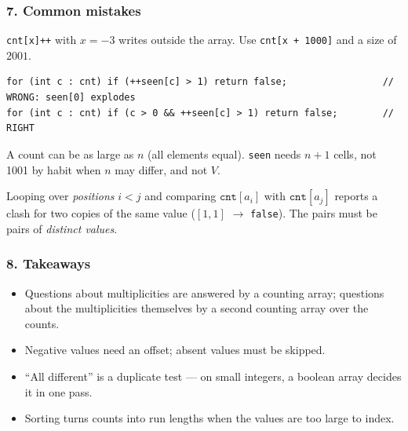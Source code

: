 \subsubsection*{7. Common mistakes}

\begin{warningbox}
\texttt{cnt[x]++} with $x = -3$ writes outside the array. Use \texttt{cnt[x + 1000]} and a size of $2001$.
\end{warningbox}

\begin{warningbox}
\begin{lstlisting}[style=snippet]
for (int c : cnt) if (++seen[c] > 1) return false;                 // WRONG: seen[0] explodes
for (int c : cnt) if (c > 0 && ++seen[c] > 1) return false;        // RIGHT
\end{lstlisting}
\end{warningbox}

\begin{warningbox}
A count can be as large as $n$ (all elements equal). \texttt{seen} needs $n + 1$ cells, not 1001 by habit when $n$ may differ, and not $V$.
\end{warningbox}

\begin{warningbox}
Looping over \emph{positions} $i < j$ and comparing $\texttt{cnt}[a_i]$ with $\texttt{cnt}[a_j]$ reports a clash for two copies of the same value ($[1,1]$ $\to$ \texttt{false}). The pairs must be pairs of \emph{distinct values}.
\end{warningbox}

\subsubsection*{8. Takeaways}

\begin{itemize}[leftmargin=*]
    \item Questions about multiplicities are answered by a counting array; questions about the multiplicities themselves by a second counting array over the counts.
    \item Negative values need an offset; absent values must be skipped.
    \item ``All different'' is a duplicate test --- on small integers, a boolean array decides it in one pass.
    \item Sorting turns counts into run lengths when the values are too large to index.
\end{itemize}

